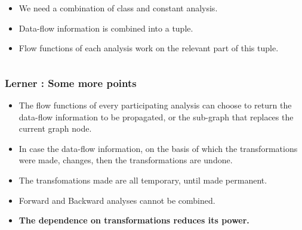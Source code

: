 \begin{frame}
\begin{columns}
\begin{column}{0.5\linewidth}
{\begin{itemize}
                \item<2-4> We need a combination of class and constant analysis.

                \item<3-4> Data-flow information is combined into a tuple.

                \item<4> Flow functions of each analysis work on the relevant part of this tuple.
            \end{itemize}
        }

    \end{column}
    \end{columns}
\end{frame}


\begin{frame}
  \frametitle{Lerner : Some more points}
    \begin{itemize}
        \item<1-> The flow functions of every participating analysis can choose to return the data-flow information to be propagated, or the sub-graph that replaces the current graph node.

        \item<2-> In case the data-flow information, on the basis of which the transformations were made, changes, then the transformations are undone.

        \item<3-> The transfomations made are all temporary, until made permanent.

        \item<4-> Forward and Backward analyses cannot be combined.

        \item<5-> \textbf{The dependence on transformations reduces its power.}
    \end{itemize}
\end{frame}


